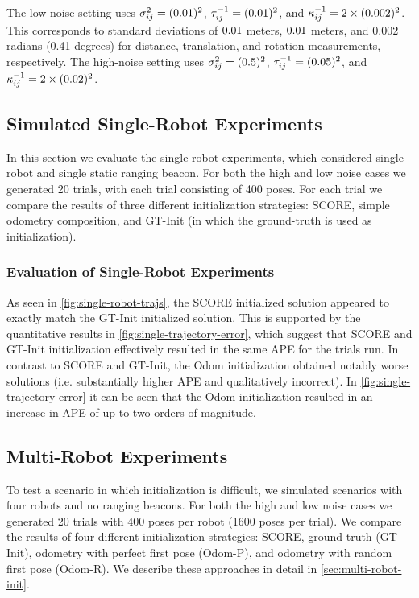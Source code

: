 The low-noise setting uses $\sigma^{2}_{ij} = (0.01)^2$, $\tau^{-1}_{ij} =
(0.01)^2$, and $\kappa^{-1}_{ij} = 2 \times (0.002)^2$. This corresponds to standard
deviations of $0.01$ meters, $0.01$ meters, and 0.002 radians
(0.41 degrees) for distance, translation, and rotation measurements,
respectively. The high-noise setting uses $\sigma^{2}_{ij} = (0.5)^2$,
$\tau^{-1}_{ij} = (0.05)^2$, and $\kappa^{-1}_{ij} = 2 \times (0.02)^2$.


\subsection{Simulated Single-Robot Experiments}
\label{sec:single-robot-experiments}

In this section we evaluate the single-robot experiments, which considered
single robot and single static ranging beacon. For both the high and low noise
cases we generated 20 trials, with each trial consisting of 400 poses. For each
trial we compare the results of three different initialization strategies:
SCORE, simple odometry composition, and GT-Init (in which the ground-truth is
used as initialization).

\subsubsection{Evaluation of Single-Robot Experiments}

As seen in \cref{fig:single-robot-trajs}, the SCORE initialized solution
appeared to exactly match the GT-Init initialized solution. This is supported by
the quantitative results in \cref{fig:single-trajectory-error}, which suggest
that SCORE and GT-Init initialization effectively resulted in the same APE for
the trials run. In contrast to SCORE and GT-Init, the Odom initialization
obtained notably worse solutions (i.e. substantially higher APE and
qualitatively incorrect).  In \cref{fig:single-trajectory-error} it can be seen
that the Odom initialization resulted in an increase in APE of up to two orders
of magnitude.

\subsection{Multi-Robot Experiments}
\label{sec:multi-robot-experiments}

\MultiRobotTrajectoryFourPanelFigure

To test a scenario in which initialization is difficult, we
simulated scenarios with four robots and no ranging beacons. For both the high
and low noise cases we generated 20 trials with 400 poses per robot (1600 poses
per trial). We compare the results of four different initialization strategies:
SCORE, ground truth (GT-Init), odometry with perfect first pose (Odom-P), and
odometry with random first pose (Odom-R). We describe these approaches in detail
in \cref{sec:multi-robot-init}.

